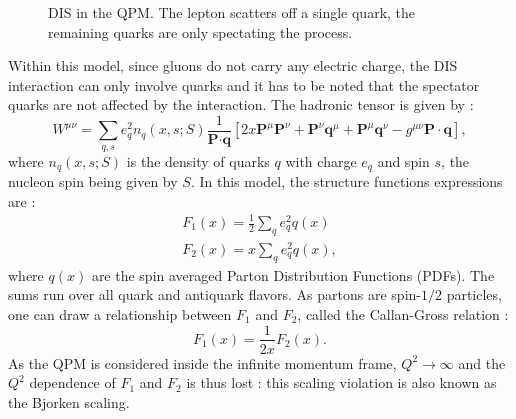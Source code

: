 \begin{figure}[!h]
  \centering

	\caption{DIS in the QPM. The lepton scatters off a single quark, the remaining quarks are only spectating the process.}
	\label{pic:DISQPM}
\end{figure}

Within this model, since gluons do not carry any electric charge, the DIS interaction can only involve quarks and it has to be noted that the spectator quarks are not affected by the interaction. The hadronic tensor is given by \cite{AEL} :
%
\begin{equation}
  W^{\mu\nu} = \sum\limits_{q,s}e^2_qn_q(x,s;S)\frac{1}{\textbf{P}\cdot\textbf{q}}\left[2x\textbf{P}^{\mu}\textbf{P}^{\nu}
  +\textbf{P}^{\nu}\textbf{q}^{\mu}+\textbf{P}^{\mu}\textbf{q}^{\nu}-g^{\mu\nu}\textbf{P}\cdot\textbf{q}\right],
  \label{eq:HadronicTensor}
\end{equation}
%
where $n_q(x,s;S)$ is the density of quarks $q$ with charge $e_q$ and spin $s$, the nucleon spin being given by $S$. In this model, the structure functions expressions are \cite{AEL} :
%
\begin{equation}
  \begin{split}
  F_1(x)=\frac{1}{2}\sum\limits_{q}e^2_qq(x) \\
  F_2(x)=x\sum\limits_{q}e^2_qq(x),
  \end{split}
\end{equation}
%
where $q(x)$ are the spin averaged Parton Distribution Functions (PDFs). The sums run over all quark and antiquark flavors. As partons are spin-$1/2$ particles, one can draw a relationship between $F_1$ and $F_2$, called the Callan-Gross relation \cite{CallanGross} :
%
\begin{equation}
  F_1(x)=\frac{1}{2x}F_2(x).
\end{equation}
%
As the QPM is considered inside the infinite momentum frame, $Q^2 \rightarrow \infty$ and the $Q^2$ dependence of $F_1$ and $F_2$ is thus lost : this scaling violation is also known as the Bjorken scaling.


